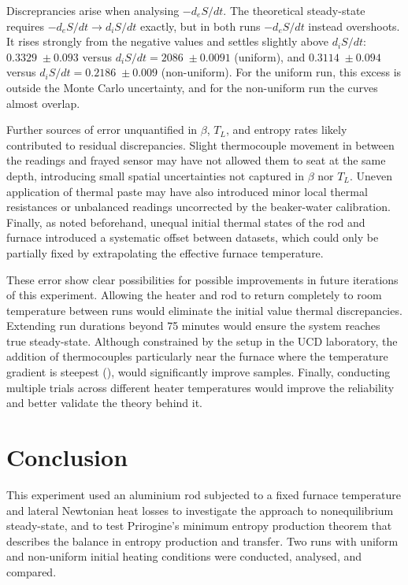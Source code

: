 \documentclass[11pt, a4paper, twocolumn]{article}
\begin{document}
Discreprancies arise when analysing $-d_eS/dt$. The theoretical steady-state requires $-d_eS/dt \to d_iS/dt$ exactly, but in both runs $-d_eS/dt$ instead overshoots. It rises strongly from the negative values and settles slightly above $d_iS/dt$: $0.3329\;\pm 0.093$ versus $d_iS/dt = 2086\;\pm 0.0091$ (uniform), and $0.3114\;\pm 0.094$ versus $d_iS/dt = 0.2186\;\pm 0.009$ (non-uniform). For the uniform run, this excess is outside the Monte Carlo uncertainty, and for the non-uniform run the curves almost overlap. 

Further sources of error unquantified in $\beta$, $T_L$, and entropy rates likely contributed to residual discrepancies. Slight thermocouple movement in between the readings and frayed sensor may have not allowed them to seat at the same depth, introducing small spatial uncertainties not captured in $\beta$ nor $T_L$. Uneven application of thermal paste may have also introduced minor local thermal resistances or unbalanced readings uncorrected by the beaker-water calibration. Finally, as noted beforehand, unequal initial thermal states of the rod and furnace introduced a systematic offset between datasets, which could only be partially fixed by extrapolating the effective furnace temperature.

These error show clear possibilities for possible improvements in future iterations of this experiment. Allowing the heater and rod to return completely to room temperature between runs would eliminate the initial value thermal discrepancies. Extending run durations beyond 75 minutes would ensure the system reaches true steady-state. Although constrained by the setup in the UCD laboratory, the addition of thermocouples particularly near the furnace where the temperature gradient is steepest (), would significantly improve samples. Finally, conducting multiple trials across different heater temperatures would improve the reliability and better validate the theory behind it.

\section{Conclusion}

This experiment used an aluminium rod subjected to a fixed furnace temperature and lateral Newtonian heat losses to investigate the approach to nonequilibrium steady-state, and to test Prirogine's minimum entropy production theorem that describes the balance in entropy production and transfer. Two runs with uniform and non-uniform initial heating conditions were conducted, analysed, and compared.
\end{document}
